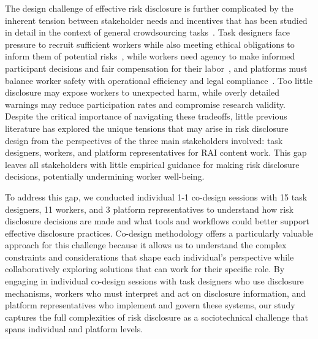 The design challenge of effective risk disclosure is further complicated by the inherent tension between stakeholder needs and incentives that has been studied in detail in the context of general crowdsourcing tasks~\cite{finnerty2013keep, gaikwad2016boomerang, salehi2015we, irani2013turkopticon, salehi2018ink}. Task designers face pressure to recruit sufficient workers while also meeting ethical obligations to inform them of potential risks~\cite{qian2025locating, finnerty2013keep, kittur2008crowdsourcing, zheng2011task, bragg2018sprout}, while workers need agency to make informed participant decisions and fair compensation for their labor~\cite{irani2013turkopticon, salehi2018ink, martin2014being, silberman2018responsible, toxtli2021quantifying, schlicher2021flexible}, and platforms must balance worker safety with operational efficiency and legal compliance~\cite{gaikwad2016boomerang, xu2017incentivizing, xia2020privacy, allen2018design}. Too little disclosure may expose workers to unexpected harm, while overly detailed warnings may reduce participation rates and compromise research validity. Despite the critical importance of navigating these tradeoffs, little previous literature has explored the unique tensions that may arise in risk disclosure design from the perspectives of the three main stakeholders involved: task designers, workers, and platform representatives for RAI content work. This gap leaves all stakeholders with little empirical guidance for making risk disclosure decisions, potentially undermining worker well-being. 



To address this gap, we conducted individual 1-1 co-design sessions with 15 task designers, 11 workers, and 3 platform representatives to understand how risk disclosure decisions are made and what tools and workflows could better support effective disclosure practices. Co-design methodology offers a particularly valuable approach for this challenge because it allows us to understand the complex constraints and considerations that shape each individual's perspective while collaboratively exploring solutions that can work for their specific role. By engaging in individual co-design sessions with task designers who use disclosure mechanisms, workers who must interpret and act on disclosure information, and platform representatives who implement and govern these systems, our study captures the full complexities of risk disclosure as a sociotechnical challenge that spans individual and platform levels. 

